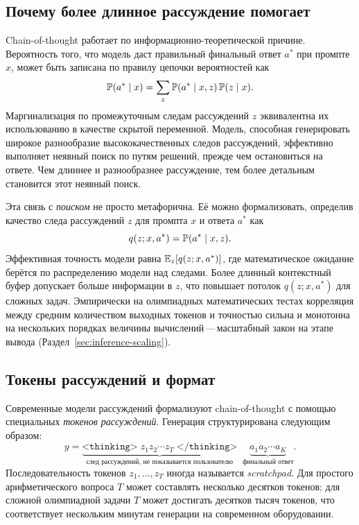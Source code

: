 \subsection{Почему более длинное рассуждение помогает}
\label{subsec:why-cot-helps}

Chain-of-thought работает по информационно-теоретической причине.
Вероятность того, что модель даст правильный финальный ответ $a^*$
при промпте $x$, может быть записана по правилу цепочки вероятностей как
\begin{equation}
\label{eq:cot-chain-rule}
\mathbb{P}(a^* \mid x)
  = \sum_{z} \mathbb{P}(a^* \mid x, z)\,\mathbb{P}(z \mid x).
\end{equation}
Маргинализация по промежуточным следам рассуждений $z$ эквивалентна
их использованию в качестве скрытой переменной. Модель, способная генерировать широкое
разнообразие высококачественных следов рассуждений, эффективно выполняет
неявный поиск по путям решений, прежде чем остановиться на ответе.
Чем длиннее и разнообразнее рассуждение, тем более детальным становится этот
неявный поиск.

Эта связь с \emph{поиском} не просто
метафорична. Её можно формализовать, определив качество
следа рассуждений $z$ для промпта $x$ и ответа $a^*$ как
\[
q(z; x, a^*) = \mathbb{P}(a^* \mid x, z).
\]
Эффективная точность модели равна $\operatorname{\mathbb{E}}_z[q(z; x, a^*)]$, где
математическое ожидание берётся по распределению модели над следами. Более длинный
контекстный буфер допускает больше информации в $z$, что повышает
потолок $q(z; x, a^*)$ для сложных задач. Эмпирически на
олимпиадных математических тестах корреляция между средним количеством
выходных токенов и точностью сильна и монотонна на нескольких
порядках величины вычислений\,---\,масштабный закон на этапе вывода
(Раздел~\ref{sec:inference-scaling}).

\subsection{Токены рассуждений и формат}
\label{subsec:thinking-tokens}

Современные модели рассуждений формализуют chain-of-thought с помощью специальных
\emph{токенов рассуждений}. Генерация
структурирована следующим образом:
\begin{equation}
\label{eq:thinking-format}
y = \underbrace{\texttt{<thinking>}\; z_1 z_2 \cdots z_T
                \;\texttt{</thinking>}}_{\text{след рассуждений, не показывается пользователю}}
    \;\;\underbrace{a_1 a_2 \cdots a_K}_{\text{финальный ответ}}.
\end{equation}
Последовательность токенов $z_1, \ldots, z_T$ иногда называется
\emph{scratchpad}. Для простого арифметического
вопроса $T$ может составлять несколько десятков токенов; для сложной олимпиадной
задачи $T$ может достигать десятков тысяч токенов, что соответствует
нескольким минутам генерации на современном оборудовании.


